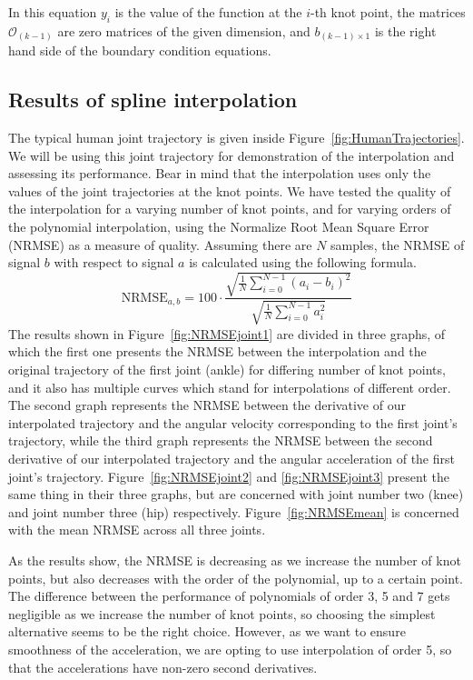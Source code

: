 \documentclass[12pt, a4paper]{article}
\begin{document}
In this equation $y_i$ is the value of the function at the $i$-th knot point, the matrices $\mathcal{O}_{(k-1)}$ are zero matrices of the given dimension, and $b_{(k-1)\times 1}$ is the right hand side of the boundary condition equations.

\subsection{Results of spline interpolation}
The typical human joint trajectory is given inside Figure~\ref{fig:HumanTrajectories}. We will be using this joint trajectory for demonstration of the interpolation and assessing its performance. Bear in mind that the interpolation uses only the values of the joint trajectories at the knot points. We have tested the quality of the interpolation for a varying number of knot points, and for varying orders of the polynomial interpolation, using the Normalize Root Mean Square Error (NRMSE) as a measure of quality. Assuming there are $N$ samples, the NRMSE of signal $b$ with respect to signal $a$ is calculated using the following formula.
\begin{equation}
    \text{NRMSE}_{a,b} = 100 \cdot \frac{\sqrt{\frac{1}{N} \sum_{i=0}^{N-1} (a_i - b_i)^2}}{\sqrt{\frac{1}{N} \sum_{i=0}^{N-1} a_i^2}}
\end{equation}
The results shown in Figure~\ref{fig:NRMSEjoint1} are divided in three graphs, of which the first one presents the NRMSE between the interpolation and the original trajectory of the first joint (ankle) for differing number of knot points, and it also has multiple curves which stand for interpolations of different order. The second graph represents the NRMSE between the derivative of our interpolated trajectory and the angular velocity corresponding to the first joint's trajectory, while the third graph represents the NRMSE between the second derivative of our interpolated trajectory and the angular acceleration of the first joint's trajectory. Figure~\ref{fig:NRMSEjoint2} and \ref{fig:NRMSEjoint3} present the same thing in their three graphs, but are concerned with joint number two (knee) and joint number three (hip) respectively.  Figure~\ref{fig:NRMSEmean} is concerned with the mean NRMSE across all three joints. \par
As the results show, the NRMSE is decreasing as we increase the number of knot points, but also decreases with the order of the polynomial, up to a certain point. The difference between the performance of polynomials of order 3, 5 and 7 gets negligible as we increase the number of knot points, so choosing the simplest alternative seems to be the right choice. However, as we want to ensure smoothness of the acceleration, we are opting to use interpolation of order 5, so that the accelerations have non-zero second derivatives. \par
\end{document}
